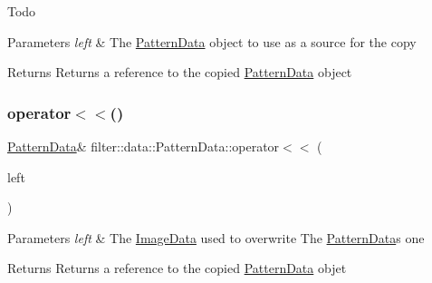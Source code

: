 \begin{DoxyRefDesc}{Todo}
\item[\hyperlink{todo__todo000026}{Todo}]\end{DoxyRefDesc}

\begin{DoxyParams}{Parameters}
{\em left} & The \hyperlink{classfilter_1_1data_1_1_pattern_data}{Pattern\+Data} object to use as a source for the copy \\
\hline
\end{DoxyParams}
\begin{DoxyReturn}{Returns}
Returns a reference to the copied \hyperlink{classfilter_1_1data_1_1_pattern_data}{Pattern\+Data} object 
\end{DoxyReturn}
\mbox{\label{classfilter_1_1data_1_1_pattern_data_a51313490894a4f3a0b4568d4c8b2462d}} 
\subsubsection{\texorpdfstring{operator$<$$<$()}{operator<<()}\hspace{0.1cm}{\footnotesize\ttfamily [2/2]}}
{\footnotesize\ttfamily \hyperlink{classfilter_1_1data_1_1_pattern_data}{Pattern\+Data}\& filter\+::data\+::\+Pattern\+Data\+::operator$<$$<$ (\begin{DoxyParamCaption}\item[{const \hyperlink{classfilter_1_1data_1_1_image_data}{Image\+Data} \&}]{left }\end{DoxyParamCaption})\hspace{0.3cm}{\ttfamily [inline]}}


\begin{DoxyParams}{Parameters}
{\em left} & The \hyperlink{classfilter_1_1data_1_1_image_data}{Image\+Data} used to overwrite The \hyperlink{classfilter_1_1data_1_1_pattern_data}{Pattern\+Data}\textquotesingle{}s one \\
\hline
\end{DoxyParams}
\begin{DoxyReturn}{Returns}
Returns a reference to the copied \hyperlink{classfilter_1_1data_1_1_pattern_data}{Pattern\+Data} objet 
\end{DoxyReturn}
\mbox{\label{classfilter_1_1data_1_1_pattern_data_ab7207131a33c3708fa04fa832ae0f458}} 

